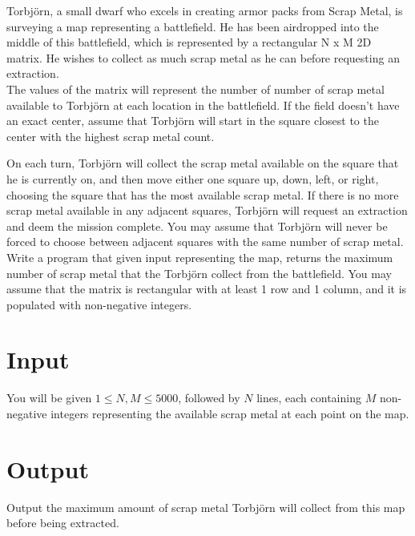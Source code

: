 
Torbjörn, a small dwarf who excels in creating armor packs from Scrap Metal, is surveying a map representing a
battlefield. He has been airdropped into the middle of this battlefield, which is represented by a rectangular N x M 2D
matrix. He wishes to collect as much scrap metal as he can before requesting an extraction.\\

The values of the matrix will represent the number of number of scrap metal available to Torbjörn at each location in the 
battlefield. If the field doesn’t have an exact center, assume that Torbjörn will start in the square closest to the center 
with the highest scrap metal count.

On each turn, Torbjörn will collect the scrap metal available on the square that he is currently on, and then move
either one square up, down, left, or right, choosing the square that has the most available scrap metal. If there is no
more scrap metal available in any adjacent squares, Torbjörn will request an extraction and deem the mission complete.
You may assume that Torbjörn will never be forced to choose between adjacent squares with the same number of scrap
metal. \\

Write a program that given input representing the map, returns the maximum number of scrap metal that the Torbjörn
collect from the battlefield. You may assume that the matrix is rectangular with at least 1 row and 1 column, and it is
populated with non-negative integers. \\

\section*{Input}
You will be given $1 \leq N,M \leq 5000$, followed by $N$ lines, each containing $M$ non-negative integers representing the 
available scrap metal at each point on the map.
\section*{Output}
Output the maximum amount of scrap metal Torbjörn will collect from this map before being extracted.\\
